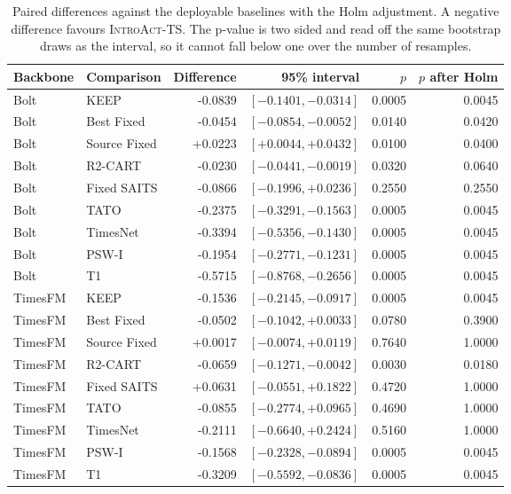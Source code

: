 \documentclass{article}
\newcommand{\introact}{\textsc{IntroAct-TS}}
\begin{document}
\begin{table}[!t]
  \caption{Paired differences against the deployable baselines with the Holm adjustment.
  A negative difference favours \introact{}. The p-value is two sided and read off the same
  bootstrap draws as the interval, so it cannot fall below one over the number of resamples.}
  \label{tab:app-holm}
  \centering
  \small
  \setlength{\tabcolsep}{4pt}
\begin{tabular*}{\textwidth}{@{\extracolsep{\fill}}llrrrr@{}}
    \toprule
    Backbone & Comparison & Difference & 95\% interval & $p$ & $p$ after Holm \\
    \midrule
Bolt & KEEP & -0.0839 & $[-0.1401,-0.0314]$ & 0.0005 & 0.0045 \\
Bolt & Best Fixed & -0.0454 & $[-0.0854,-0.0052]$ & 0.0140 & 0.0420 \\
Bolt & Source Fixed & +0.0223 & $[+0.0044,+0.0432]$ & 0.0100 & 0.0400 \\
Bolt & R2-CART & -0.0230 & $[-0.0441,-0.0019]$ & 0.0320 & 0.0640 \\
Bolt & Fixed SAITS & -0.0866 & $[-0.1996,+0.0236]$ & 0.2550 & 0.2550 \\
Bolt & TATO & -0.2375 & $[-0.3291,-0.1563]$ & 0.0005 & 0.0045 \\
Bolt & TimesNet & -0.3394 & $[-0.5356,-0.1430]$ & 0.0005 & 0.0045 \\
Bolt & PSW-I & -0.1954 & $[-0.2771,-0.1231]$ & 0.0005 & 0.0045 \\
Bolt & T1 & -0.5715 & $[-0.8768,-0.2656]$ & 0.0005 & 0.0045 \\
TimesFM & KEEP & -0.1536 & $[-0.2145,-0.0917]$ & 0.0005 & 0.0045 \\
TimesFM & Best Fixed & -0.0502 & $[-0.1042,+0.0033]$ & 0.0780 & 0.3900 \\
TimesFM & Source Fixed & +0.0017 & $[-0.0074,+0.0119]$ & 0.7640 & 1.0000 \\
TimesFM & R2-CART & -0.0659 & $[-0.1271,-0.0042]$ & 0.0030 & 0.0180 \\
TimesFM & Fixed SAITS & +0.0631 & $[-0.0551,+0.1822]$ & 0.4720 & 1.0000 \\
TimesFM & TATO & -0.0855 & $[-0.2774,+0.0965]$ & 0.4690 & 1.0000 \\
TimesFM & TimesNet & -0.2111 & $[-0.6640,+0.2424]$ & 0.5160 & 1.0000 \\
TimesFM & PSW-I & -0.1568 & $[-0.2328,-0.0894]$ & 0.0005 & 0.0045 \\
TimesFM & T1 & -0.3209 & $[-0.5592,-0.0836]$ & 0.0005 & 0.0045 \\

\end{tabular*}
\end{table}
\end{document}
